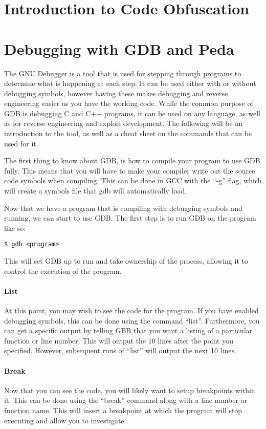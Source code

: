 	\section{Introduction to Code Obfuscation}
	\section{Debugging with GDB and Peda}
		The GNU Debugger is a tool that is used for stepping through programs to determine what is happening at each step. 
		It can be used either with or without debugging symbols, 
		however having these makes debugging and reverse engineering easier as you have the working code. 
		While the common purpose of GDB is debugging C and C++ programs, it can be used on any language, as well as for reverse engineering and exploit development. 
		The following will be an introduction to the tool, as well as a cheat sheet on the commands that can be used for it. 
			
		The first thing to know about GDB, is how to compile your program to use GDB fully. 
		This means that you will have to make your compiler write out the source code symbols when compiling. 
		This can be done in GCC with the ``-g'' flag, which will create a symbols file that gdb will automatically load. 

		Now that we have a program that is compiling with debugging symbols and running, we can start to use GDB. 
		The first step is to run GDB on the program like so:
		\begin{lstlisting}[style=CLI]
			$ gdb <program>
		\end{lstlisting}
		This will set GDB up to run and take ownership of the process, allowing it to control the execution of the program. 

		\paragraph{List}
		At this point, you may wish to see the code for the program. 
		If you have enabled debugging symbols, this can be done using the command ``list''. 
		Furthermore, you can get a specific output by telling GBB that you want a listing of a particular function or line number. 
		This will output the 10 lines after the point you specified. 
		However, subsequent runs of ``list'' will output the next 10 lines. 

		\paragraph{Break}
		Now that you can see the code, you will likely want to setup breakpoints within it. 
		This can be done using the ``break'' command along with a line number or function name. 
		This will insert a breakpoint at which the program will stop executing and allow you to investigate. 
			
